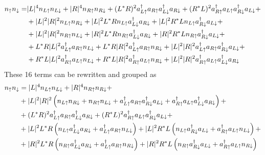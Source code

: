 \begin{equation*}
  \begin{split}
    n_\uparrow n_\downarrow =& |L|^4 n_{L\uparrow}n_{L\downarrow}+
     |R|^4 n_{R\uparrow}n_{R\downarrow}+
     (L^*R)^2a^{\dagger}_{L\uparrow}a_{R\uparrow}a^{\dagger}_{L\downarrow}a_{R\downarrow}+
     (R^*L)^2a^{\dagger}_{R\uparrow}a_{L\uparrow}a^{\dagger}_{R\downarrow}a_{L\downarrow}+\\
  &+|L|^2|R|^2 n_{L\uparrow}n_{R\downarrow}+
    |L|^2L^*R n_{L\uparrow}a^{\dagger}_{L\downarrow}a_{R\downarrow}+
    |L|^2R^*L n_{L\uparrow}a^{\dagger}_{R\downarrow}a_{L\downarrow}+\\
  &+|L|^2|R|^2 n_{R\uparrow}n_{L\downarrow}+
    |R|^2L^*R n_{R\uparrow}a^{\dagger}_{L\downarrow}a_{R\downarrow}+
    |R|^2R^*L n_{R\uparrow}a^{\dagger}_{R\downarrow}a_{L\downarrow}+\\
  &+L^*R|L|^2a^{\dagger}_{L\uparrow}a_{R\uparrow}n_{L\downarrow}+
    L^*R|R|^2a^{\dagger}_{L\uparrow}a_{R\uparrow}n_{R\downarrow}+
    |L|^2|R|^2a^{\dagger}_{L\uparrow}a_{R\uparrow}a^{\dagger}_{R\downarrow}a_{L\downarrow}+\\
  &+R^*L|L|^2a^{\dagger}_{R\uparrow}a_{L\uparrow}n_{L\downarrow}+
    R^*L|R|^2a^{\dagger}_{R\uparrow}a_{L\uparrow}n_{R\downarrow}+
    |L|^2|R|^2a^{\dagger}_{R\uparrow}a_{L\uparrow}a^{\dagger}_{L\downarrow}a_{R\downarrow}
  \end{split}
\end{equation*}
These 16 terms can be rewritten and grouped as
\begin{equation*}
  \begin{split}
    n_\uparrow n_\downarrow&= |L|^4 n_{L\uparrow}n_{L\downarrow}+ |R|^4 n_{R\uparrow}n_{R\downarrow}+\\
  &+|L|^2|R|^2\left(n_{L\uparrow}n_{R\downarrow} + n_{R\uparrow}n_{L\downarrow}+
                    a^{\dagger}_{L\uparrow}a_{R\uparrow}a^{\dagger}_{R\downarrow}a_{L\downarrow}+
                    a^{\dagger}_{R\uparrow}a_{L\uparrow}a^{\dagger}_{L\downarrow}a_{R\downarrow}
              \right)+\\
  &+(L^*R)^2a^{\dagger}_{L\uparrow}a_{R\uparrow}a^{\dagger}_{L\downarrow}a_{R\downarrow}+
     (R^*L)^2a^{\dagger}_{R\uparrow}a_{L\uparrow}a^{\dagger}_{R\downarrow}a_{L\downarrow}+\\
  &+|L|^2L^*R \left(n_{L\uparrow}a^{\dagger}_{L\downarrow}a_{R\downarrow}+
                   a^{\dagger}_{L\uparrow}a_{R\uparrow}n_{L\downarrow}\right)+
    |L|^2R^*L \left(n_{L\uparrow}a^{\dagger}_{R\downarrow}a_{L\downarrow}+
                   a^{\dagger}_{R\uparrow}a_{L\uparrow}n_{L\downarrow}\right)+\\
  &+|R|^2L^*R \left(n_{R\uparrow}a^{\dagger}_{L\downarrow}a_{R\downarrow}+
                   a^{\dagger}_{L\uparrow}a_{R\uparrow}n_{R\downarrow}\right)+
    |R|^2R^*L \left(n_{R\uparrow}a^{\dagger}_{R\downarrow}a_{L\downarrow}+
                   a^{\dagger}_{R\uparrow}a_{L\uparrow}n_{R\downarrow}\right)
  \end{split}
\end{equation*}

